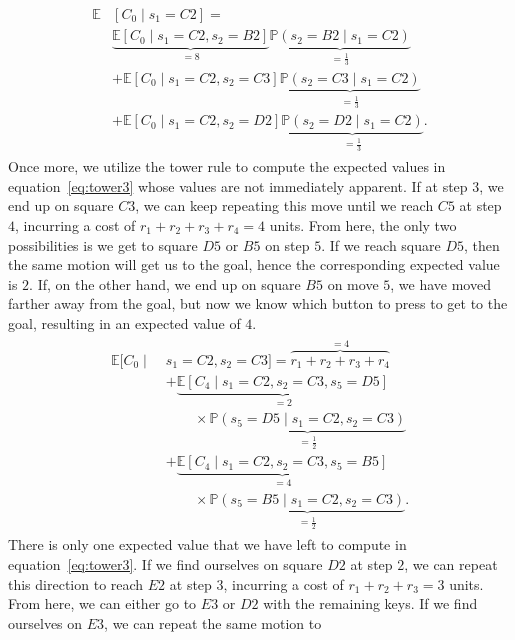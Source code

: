 \begin{align}
    \begin{split}
    \mathbb{E}&\left[ C_0 \mid s_1 = C2 \right] = \\
    &\underbrace{\mathbb{E}[C_0 \mid s_1 = C2, s_2 = B2]}_{=8} \underbrace{\mathbb{P}(s_2 = B2 \mid s_1 = C2)}_{=\frac{1}{3}} \\
    &+ \mathbb{E}[C_0 \mid s_1=C2, s_2 = C3] \underbrace{\mathbb{P}(s_2 = C3 \mid s_1 = C2)}_{=\frac{1}{3}} \\
    &+ \mathbb{E}[C_0 \mid s_1 = C2, s_2 = D2] \underbrace{\mathbb{P}(s_2 = D2 \mid s_1 = C2)}_{=\frac{1}{3}}.
    \end{split}
    \label{eq:tower3}
\end{align}
%
Once more, we utilize the tower rule to compute the expected values in
equation~\eqref{eq:tower3} whose values are not immediately apparent. If at step
$3$, we end up on square $C3$, we can keep repeating this move until we reach
$C5$ at step $4$, incurring a cost of $r_1 + r_2 + r_3 + r_4 = 4$ units. From
here, the only two possibilities is we get to square $D5$ or $B5$ on step $5$.
If we reach square $D5$, then the same motion will get us to the goal, hence the
corresponding expected value is $2$. If, on the other hand, we end up on square
$B5$ on move $5$, we have moved farther away from the goal, but now we know
which button to press to get to the goal, resulting in an expected value of $4$.
%
\begin{align*}
    \begin{split}
    \mathbb{E}[C_0 \mid \; &s_1=C2, s_2=C3] = \overbrace{r_1 + r_2 + r_3 + r_4}^{=4} \\
    &+ \underbrace{\mathbb{E}[C_4 \mid s_1=C2, s_2=C3, s_5=D5]}_{=2} \\ &{\phantom{1234}}\times \underbrace{\mathbb{P}(s_5=D5 \mid s_1=C2, s_2=C3)}_{=\frac{1}{2}} \\
    &+ \underbrace{\mathbb{E}[C_4 \mid s_1=C2, s_2=C3, s_5=B5]}_{=4} \\ &{\phantom{1234}} \times \underbrace{\mathbb{P}(s_5=B5 \mid s_1=C2, s_2=C3)}_{=\frac{1}{2}}.
    \end{split}
\end{align*}
%
There is only one expected value that we have left to compute in
equation~\eqref{eq:tower3}. If we find ourselves on square $D2$ at step $2$, we
can repeat this direction to reach $E2$ at step $3$, incurring a cost of $r_1 +
r_2 + r_3 = 3$ units. From here, we can either go to $E3$ or $D2$ with the
remaining keys. If we find ourselves on $E3$, we can repeat the same motion to
